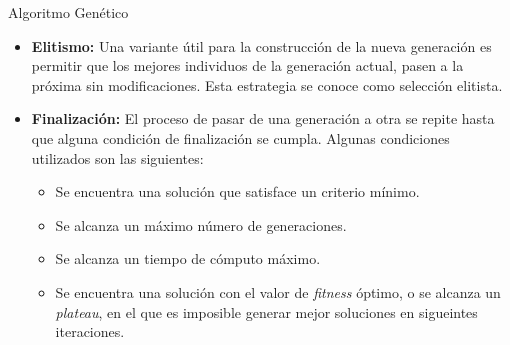 \documentclass[center,10pt,cm]{beamer}
\begin{document}
\begin{frame}{Algoritmo Gen\'etico}

  \begin{itemize}\itemsep0.2cm
  \item {\bf Elitismo:} Una variante \'util para la construcci\'on de la nueva generaci\'on es permitir que los mejores individuos de la generaci\'on actual,
    pasen a la pr\'oxima sin modificaciones. Esta estrategia se conoce como selecci\'on elitista.

  \item {\bf Finalizaci\'on:} El proceso de pasar de una generaci\'on a otra se repite hasta que alguna condici\'on de finalizaci\'on se cumpla. Algunas condiciones utilizados son las siguientes:
    \begin{itemize}\itemsep0.2cm
    \item Se encuentra una soluci\'on que satisface un criterio m\'inimo.
    \item Se alcanza un m\'aximo n\'umero de generaciones.
    \item Se alcanza un tiempo de c\'omputo m\'aximo.
    \item Se encuentra una soluci\'on con el valor de \emph{fitness} \'optimo, o se alcanza un \emph{plateau}, en el que es imposible generar mejor soluciones en sigueintes iteraciones.
    \end{itemize}

  \end{itemize}




\end{frame}
\end{document}
